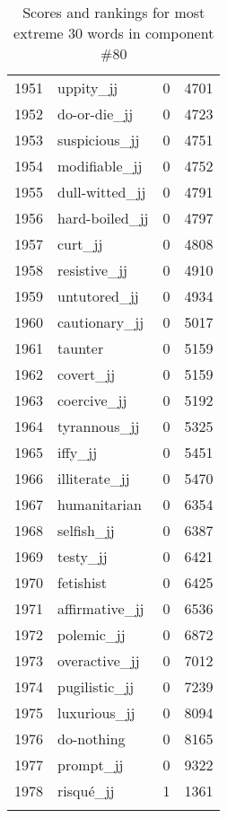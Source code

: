 \begin{longtable}[!htbp]{| rlr@{.}l |}
    1951 & uppity\_jj & 0 & 4701 \\
    1952 & do-or-die\_jj & 0 & 4723 \\
    1953 & suspicious\_jj & 0 & 4751 \\
    1954 & modifiable\_jj & 0 & 4752 \\
    1955 & dull-witted\_jj & 0 & 4791 \\
    1956 & hard-boiled\_jj & 0 & 4797 \\
    1957 & curt\_jj & 0 & 4808 \\
    1958 & resistive\_jj & 0 & 4910 \\
    1959 & untutored\_jj & 0 & 4934 \\
    1960 & cautionary\_jj & 0 & 5017 \\
    1961 & taunter & 0 & 5159 \\
    1962 & covert\_jj & 0 & 5159 \\
    1963 & coercive\_jj & 0 & 5192 \\
    1964 & tyrannous\_jj & 0 & 5325 \\
    1965 & iffy\_jj & 0 & 5451 \\
    1966 & illiterate\_jj & 0 & 5470 \\
    1967 & humanitarian & 0 & 6354 \\
    1968 & selfish\_jj & 0 & 6387 \\
    1969 & testy\_jj & 0 & 6421 \\
    1970 & fetishist & 0 & 6425 \\
    1971 & affirmative\_jj & 0 & 6536 \\
    1972 & polemic\_jj & 0 & 6872 \\
    1973 & overactive\_jj & 0 & 7012 \\
    1974 & pugilistic\_jj & 0 & 7239 \\
    1975 & luxurious\_jj & 0 & 8094 \\
    1976 & do-nothing & 0 & 8165 \\
    1977 & prompt\_jj & 0 & 9322 \\
    1978 & risqué\_jj & 1 & 1361 \\
    \hline
    \caption{Scores and rankings for most extreme 30 words in component \#80} \\
\end{longtable}
